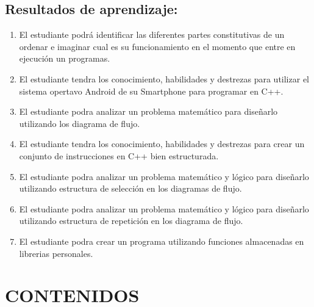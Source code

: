 \documentclass[a4pa<per,12pt,spanish]{article}
\newcommand{\ResuApreA}{El estudiante podrá identificar las diferentes partes constitutivas de un ordenar e imaginar cual es su funcionamiento en el momento que entre en ejecución un programas.}
\newcommand{\ResuApreB}{El estudiante tendra los conocimiento, habilidades y destrezas para utilizar el sistema opertavo Android de su Smartphone para programar en C++.}
\newcommand{\ResuApreC}{El estudiante podra analizar un problema matemático para diseñarlo utilizando los diagrama de flujo.}
\newcommand{\ResuApreD}{El estudiante tendra los conocimiento, habilidades y destrezas para crear un conjunto de instrucciones en C++ bien estructurada.}
\newcommand{\ResuApreE}{El estudiante podra analizar un problema matemático y lógico para  diseñarlo utilizando estructura de selección en los diagramas de flujo.}
\newcommand{\ResuApreF}{El estudiante podra analizar un problema matemático y lógico para  diseñarlo utilizando estructura de repetición en los diagrama de flujo.}
\newcommand{\ResuApreG}{El estudiante podra crear un programa utilizando funciones almacenadas en librerias personales.}
\begin{document}
\subsection{Resultados de aprendizaje:}

\begin{enumerate}
\item \ResuApreA
\item \ResuApreB
\item \ResuApreC
\item \ResuApreD
\item \ResuApreE
\item \ResuApreF
\item \ResuApreG

\end{enumerate}


\section{CONTENIDOS}
\label{sec:contenidos}
\end{document}

